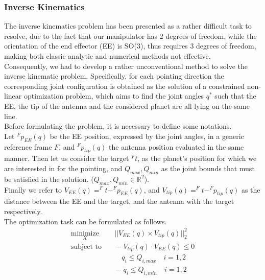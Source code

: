 \subsubsection{Inverse Kinematics}
The inverse kinematics problem has been presented as a rather difficult task to resolve, due to the fact that our manipulator has 2 degrees of freedom, while the orientation of the end effector (EE) is SO(3), thus requires 3 degrees of freedom, making both classic analytic and numerical methods not effective.\\
Consequently, we had to develop a rather unconventional method to solve the inverse kinematic problem. Specifically, for each pointing direction the corresponding joint configuration is obtained as the solution of a constrained non-linear optimization problem, which aims to find the joint angles $q^*$ such that the EE, the tip of the antenna and the considered planet are all lying on the same line.\\
Before formulating the problem, it is necessary to define some notations.\\
Let $^Fp_{EE}(q)$ be the EE position, expressed by the joint angles, in a generic reference frame $F$, and $^Fp_{tip}(q)$ the antenna position evaluated in the same manner. Then let us consider the target $^Ft$, as the planet's position for which we are interested in for the pointing, and $Q_{max}, Q_{min}$ as the joint bounds that must be satisfied in the solution. ($Q_{max}, Q_{min} \in \mathbb{R}^2$).\\ Finally we refer to $V_{EE}(q) = ^Ft - ^Fp_{EE}(q)$, and $V_{tip}(q) =  ^Ft - ^Fp_{tip}(q) $ as the distance between the EE and the target, and the antenna with the target respectively.\\
The optimization task can be formulated as follows.\\

\begin{subequations}
\label{eq:optim}
\begin{align}
    \underset{X}{\text{minimize}}
        & \quad ||V_{EE}(q) \times V_{tip}(q)||_2^2 \label{eq:objective}\\
    \text{subject to} 
        & \quad -V_{tip}(q)\cdot V_{EE}(q) \leq 0 \label{eq:scalar}\\
        & \quad \quad q_i \leq Q_{i,max} \quad i = 1, 2 \nonumber\\
        & \quad -q_i \leq Q_{i,min} \quad i = 1, 2 \nonumber
\end{align}
\end{subequations}

